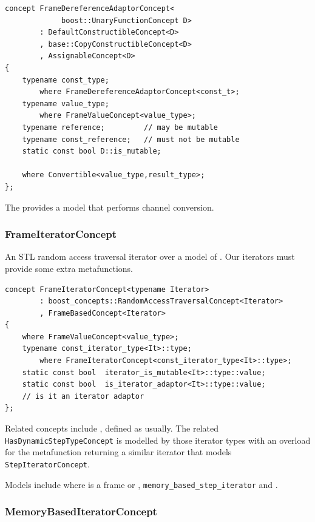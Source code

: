 \begin{lstlisting}
concept FrameDereferenceAdaptorConcept<
             boost::UnaryFunctionConcept D>
        : DefaultConstructibleConcept<D>
        , base::CopyConstructibleConcept<D>
        , AssignableConcept<D>  
{
    typename const_type;
        where FrameDereferenceAdaptorConcept<const_t>;
    typename value_type;
        where FrameValueConcept<value_type>;
    typename reference;         // may be mutable
    typename const_reference;   // must not be mutable
    static const bool D::is_mutable;

    where Convertible<value_type,result_type>;
};
\end{lstlisting}

The  provides a model that performs
channel conversion.

\subsubsection{{FrameIteratorConcept}}

An STL random access traversal iterator over a model of
. Our iterators must provide some extra
metafunctions.

\begin{lstlisting}
concept FrameIteratorConcept<typename Iterator> 
        : boost_concepts::RandomAccessTraversalConcept<Iterator>
        , FrameBasedConcept<Iterator> 
{
    where FrameValueConcept<value_type>;
    typename const_iterator_type<It>::type;         
        where FrameIteratorConcept<const_iterator_type<It>::type>;
    static const bool  iterator_is_mutable<It>::type::value;          
    static const bool  is_iterator_adaptor<It>::type::value;
    // is it an iterator adaptor
};
\end{lstlisting}

Related concepts include ,
defined as usually. The related \texttt{Has\-Dynamic\-StepTypeConcept}
is modelled by those iterator types with an overload for the
 metafunction returning a similar
iterator that models \texttt{Step\-Iterator\-Concept}.

Models include  where  is a frame or
,
\texttt{memory\-\_based\-\_step\-\_iterator} and
.

\subsubsection{{MemoryBasedIteratorConcept}}

